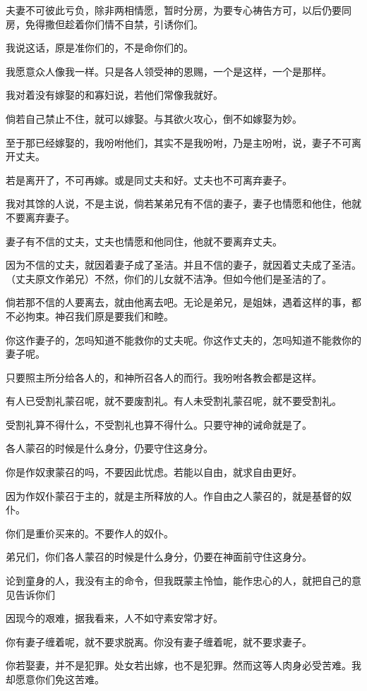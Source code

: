\documentclass[12pt,oneside]{book}
\begin{document}
夫妻不可彼此亏负，除非两相情愿，暂时分房，为要专心祷告方可，以后仍要同房，免得撒但趁着你们情不自禁，引诱你们。

我说这话，原是准你们的，不是命你们的。

我愿意众人像我一样。只是各人领受神的恩赐，一个是这样，一个是那样。

我对着没有嫁娶的和寡妇说，若他们常像我就好。

倘若自己禁止不住，就可以嫁娶。与其欲火攻心，倒不如嫁娶为妙。

至于那已经嫁娶的，我吩咐他们，其实不是我吩咐，乃是主吩咐，说，妻子不可离开丈夫。

若是离开了，不可再嫁。或是同丈夫和好。丈夫也不可离弃妻子。

我对其馀的人说，不是主说，倘若某弟兄有不信的妻子，妻子也情愿和他住，他就不要离弃妻子。

妻子有不信的丈夫，丈夫也情愿和他同住，他就不要离弃丈夫。

因为不信的丈夫，就因着妻子成了圣洁。并且不信的妻子，就因着丈夫成了圣洁。（丈夫原文作弟兄）不然，你们的儿女就不洁净。但如今他们是圣洁的了。

倘若那不信的人要离去，就由他离去吧。无论是弟兄，是姐妹，遇着这样的事，都不必拘束。神召我们原是要我们和睦。

你这作妻子的，怎吗知道不能救你的丈夫呢。你这作丈夫的，怎吗知道不能救你的妻子呢。

只要照主所分给各人的，和神所召各人的而行。我吩咐各教会都是这样。

有人已受割礼蒙召呢，就不要废割礼。有人未受割礼蒙召呢，就不要受割礼。

受割礼算不得什么，不受割礼也算不得什么。只要守神的诫命就是了。

各人蒙召的时候是什么身分，仍要守住这身分。

你是作奴隶蒙召的吗，不要因此忧虑。若能以自由，就求自由更好。

因为作奴仆蒙召于主的，就是主所释放的人。作自由之人蒙召的，就是基督的奴仆。

你们是重价买来的。不要作人的奴仆。

弟兄们，你们各人蒙召的时候是什么身分，仍要在神面前守住这身分。

论到童身的人，我没有主的命令，但我既蒙主怜恤，能作忠心的人，就把自己的意见告诉你们

因现今的艰难，据我看来，人不如守素安常才好。

你有妻子缠着呢，就不要求脱离。你没有妻子缠着呢，就不要求妻子。

你若娶妻，并不是犯罪。处女若出嫁，也不是犯罪。然而这等人肉身必受苦难。我却愿意你们免这苦难。
\end{document}
